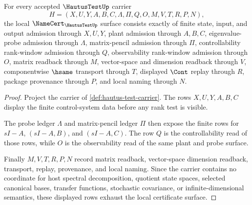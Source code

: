 \begin{theorem}
\label{thm:hautus-test-namecert-obligations}
For every accepted $\HautusTestUp$ carrier
$$
H=(X,U,Y,A,B,C,\Lambda,\Pi,Q,O,M,V,T,R,P,N),
$$
the local $\NameCert_{\HautusTestUp}$ surface consists exactly of finite state, input, and output admission through $X,U,Y$, plant admission through $A,B,C$, eigenvalue-probe admission through $\Lambda$, matrix-pencil admission through $\Pi$, controllability rank-window admission through $Q$, observability rank-window admission through $O$, matrix readback through $M$, vector-space and dimension readback through $V$, componentwise $\hsame$ transport through $T$, displayed $\Cont$ replay through $R$, package provenance through $P$, and local naming through $N$.
\end{theorem}
\begin{proof}
Project the carrier of \autoref{def:hautus-test-carrier}. The rows $X,U,Y,A,B,C$ display the finite control-system data before any rank test is visible.

The probe ledger $\Lambda$ and matrix-pencil ledger $\Pi$ then expose the finite rows for $sI-A$, $(sI-A,B)$, and $(sI-A,C)$. The row $Q$ is the controllability read of those rows, while $O$ is the observability read of the same plant and probe surface.

Finally $M,V,T,R,P,N$ record matrix readback, vector-space dimension readback, transport, replay, provenance, and local naming. Since the carrier contains no coordinate for host spectral decomposition, quotient state spaces, selected canonical bases, transfer functions, stochastic covariance, or infinite-dimensional semantics, these displayed rows exhaust the local certificate surface.
\end{proof}

